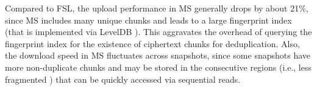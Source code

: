 Compared to FSL, the upload  performance in MS generally drops by about 21\%, since MS includes many unique chunks and leads to a large fingerprint index (that is implemented via LevelDB \cite{leveldb}). This aggravates the overhead of querying the fingerprint index for the existence of ciphertext chunks for deduplication. Also, the download speed in MS fluctuates across snapshots, since some snapshots have more non-duplicate chunks and may be stored in the consecutive regions (i.e., less fragmented \cite{lillibridge13}) that can be quickly accessed via sequential reads.





